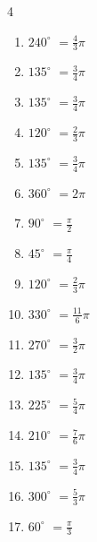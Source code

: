 \begin{multicols}{4}
\begin{enumerate}
  \item $\displaystyle 240^{\circ}$
        $\displaystyle =\frac{4}{3}\pi$

  \item $\displaystyle 135^{\circ}$
        $\displaystyle =\frac{3}{4}\pi$

  \item $\displaystyle 135^{\circ}$
        $\displaystyle =\frac{3}{4}\pi$

  \item $\displaystyle 120^{\circ}$
        $\displaystyle =\frac{2}{3}\pi$

  \item $\displaystyle 135^{\circ}$
        $\displaystyle =\frac{3}{4}\pi$

  \item $\displaystyle 360^{\circ}$
        $\displaystyle =2\pi$

  \item $\displaystyle 90^{\circ}$
        $\displaystyle =\frac{\pi}{2}$

  \item $\displaystyle 45^{\circ}$
        $\displaystyle =\frac{\pi}{4}$

  \item $\displaystyle 120^{\circ}$
        $\displaystyle =\frac{2}{3}\pi$

  \item $\displaystyle 330^{\circ}$
        $\displaystyle =\frac{11}{6}\pi$

  \item $\displaystyle 270^{\circ}$
        $\displaystyle =\frac{3}{2}\pi$

  \item $\displaystyle 135^{\circ}$
        $\displaystyle =\frac{3}{4}\pi$

  \item $\displaystyle 225^{\circ}$
        $\displaystyle =\frac{5}{4}\pi$

  \item $\displaystyle 210^{\circ}$
        $\displaystyle =\frac{7}{6}\pi$

  \item $\displaystyle 135^{\circ}$
        $\displaystyle =\frac{3}{4}\pi$

  \item $\displaystyle 300^{\circ}$
        $\displaystyle =\frac{5}{3}\pi$

  \item $\displaystyle 60^{\circ}$
        $\displaystyle =\frac{\pi}{3}$


\end{enumerate}
\end{multicols}
